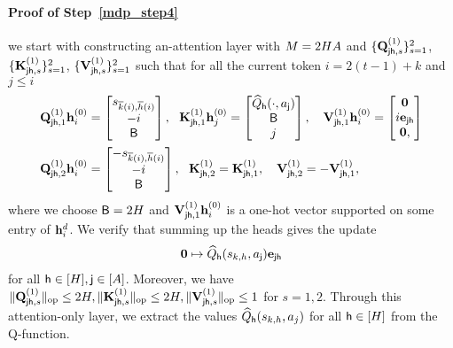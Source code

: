  \paragraph{Proof of Step~\ref{mdp_step4}}
 we start with constructing an-attention layer with ${M}=2{H}{A}$ and $\{{\mathbf Q}_{{\mathsf{j}}{\mathsf{h}},s}^{(1)}\}^2_{s=1}$, $\{{\mathbf K}_{{\mathsf{j}}{\mathsf{h}},s}^{(1)}\}^2_{s=1}$, $\{{\mathbf V}_{{\mathsf{j}}{\mathsf{h}},s}^{(1)}\}^2_{s=1}$ such that for all the current token $i= 2(t-1)+k$ and $j\leq i$
\begin{align*}
  & {\mathbf Q}_{{\mathsf{j}}{\mathsf{h}},1}^{(1)}{\mathbf h}_i^{(0)} =\begin{bmatrix}
       {s}_{\overline{k}(i),\overline{h}(i)}\\-i\\
       {\mathsf{B}}
   \end{bmatrix},~~ {\mathbf K}_{{\mathsf{j}}{\mathsf{h}},1}^{(1)}{\mathbf h}_j^{(0)} =\begin{bmatrix}
    {\widehat{{Q}}}_{\mathsf{h}}(\cdot,{a}_{\mathsf{j}})\\  {\mathsf{B}}\\ j
   \end{bmatrix},~~~
   {\mathbf V}_{{\mathsf{j}}{\mathsf{h}},1}^{(1)}{\mathbf h}_i^{(0)} =\begin{bmatrix}
       {\mathbf 0} \\ i{\mathbf e}_{{\mathsf{j}}{\mathsf{h}}}\\
       {\mathbf 0},
   \end{bmatrix}
   \\
    &{\mathbf Q}_{{\mathsf{j}}{\mathsf{h}},2}^{(1)}{\mathbf h}_i^{(0)} =\begin{bmatrix}
       -{s}_{\overline{k}(i),\overline{h}(i)}\\-i\\
       {\mathsf{B}}
   \end{bmatrix},~~ {\mathbf K}_{{\mathsf{j}}{\mathsf{h}},2}^{(1)}={\mathbf K}_{{\mathsf{j}}{\mathsf{h}},1}^{(1)},~~~
{\mathbf V}_{{\mathsf{j}}{\mathsf{h}},2}^{(1)}=-{\mathbf V}_{{\mathsf{j}}{\mathsf{h}},1}^{(1)},
\end{align*}
where we choose ${\mathsf{B}}=2{H}$ and ${\mathbf V}_{{\mathsf{j}}{\mathsf{h}},1}^{(1)}{\mathbf h}_i^{(0)}$ is a one-hot vector supported on some entry of ${\mathbf h}_i^{d}$. We verify  that summing up the heads gives the update 
\begin{align*}
    {\mathbf 0}\mapsto {\widehat{{Q}}}_{{\mathsf{h}}}({s}_{k,h},{a}_{\mathsf{j}}){\mathbf e}_{{\mathsf{j}}{\mathsf{h}}}
\end{align*}
 for all ${\mathsf{h}}\in[{H}],{\mathsf{j}}\in[{A}]$. Moreover, we have $\|{{\mathbf Q}_{{\mathsf{j}}{\mathsf{h}},s}^{(1)}}\|_{\mathrm{op}}\leq2{H},\|{{\mathbf K}_{{\mathsf{j}}{\mathsf{h}},s}^{(1)}}\|_{\mathrm{op}}\leq2{H},\|{{\mathbf V}_{{\mathsf{j}}{\mathsf{h}},s}^{(1)}}\|_{\mathrm{op}}\leq1$ for $s=1,2$. Through this attention-only layer, we extract the values ${\widehat{{Q}}}_{\mathsf{h}}({s}_{k,h},{a}_j)$ for all ${\mathsf{h}}\in[{H}]$ from the Q-function.
 
